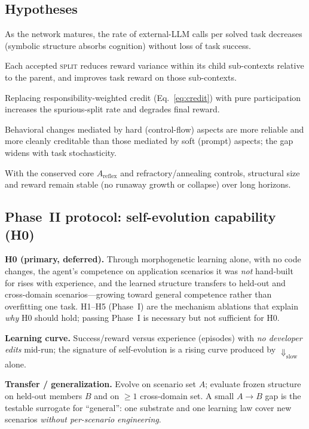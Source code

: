 \documentclass[11pt]{article}
\theoremstyle{definition}
\begin{document}
\subsection{Hypotheses}
\begin{description}[leftmargin=2.2em,itemsep=2pt]
\item[H1 (Efficiency).] As the network matures, the rate of external-LLM
  calls per solved task decreases (symbolic structure absorbs cognition)
  without loss of task success.
\item[H2 (Useful differentiation).] Each accepted \textsc{split} reduces
  reward variance within its child sub-contexts relative to the parent, and
  improves task reward on those sub-contexts.
\item[H3 (Credit necessity).] Replacing responsibility-weighted credit
  (Eq.~\ref{eq:credit}) with pure participation increases the spurious-split
  rate and degrades final reward.
\item[H4 (Hard$>$soft reliability).] Behavioral changes mediated by hard
  (control-flow) aspects are more reliable and more cleanly creditable than
  those mediated by soft (prompt) aspects; the gap widens with task
  stochasticity.
\item[H5 (Bounded self-evolution).] With the conserved core $A_\text{reflex}$
  and refractory/annealing controls, structural size and reward remain stable
  (no runaway growth or collapse) over long horizons.
\end{description}

\subsection{Phase~II protocol: self-evolution capability (H0)}
\textbf{H0 (primary, deferred).} Through morphogenetic learning alone, with no
code changes, the agent's competence on application scenarios it was \emph{not}
hand-built for rises with experience, and the learned structure transfers to
held-out and cross-domain scenarios---growing toward general competence rather
than overfitting one task. H1--H5 (Phase~I) are the mechanism ablations that
explain \emph{why} H0 should hold; passing Phase~I is necessary but not
sufficient for H0.

\noindent\textbf{Learning curve.} Success/reward versus experience (episodes)
with \emph{no developer edits} mid-run; the signature of self-evolution is a
rising curve produced by $\Downarrow_\text{slow}$ alone.

\noindent\textbf{Transfer / generalization.} Evolve on scenario set $A$;
evaluate frozen structure on held-out members $B$ and on $\geq 1$ cross-domain
set. A small $A\!\to\!B$ gap is the testable surrogate for ``general'': one
substrate and one learning law cover new scenarios \emph{without per-scenario
engineering}.
\end{document}
